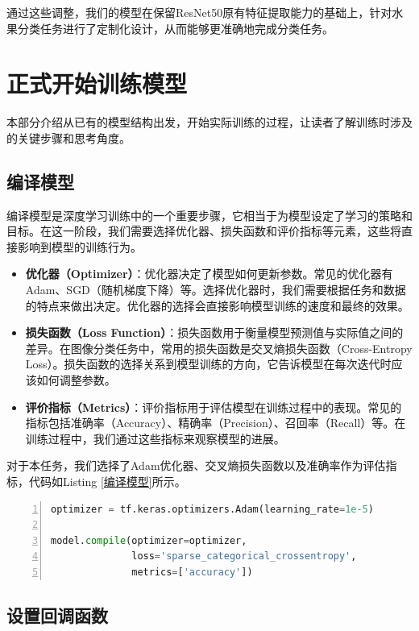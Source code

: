 通过这些调整，我们的模型在保留ResNet50原有特征提取能力的基础上，针对水果分类任务进行了定制化设计，从而能够更准确地完成分类任务。

\section{正式开始训练模型}

本部分介绍从已有的模型结构出发，开始实际训练的过程，让读者了解训练时涉及的关键步骤和思考角度。

\subsection{编译模型}

编译模型是深度学习训练中的一个重要步骤，它相当于为模型设定了学习的策略和目标。在这一阶段，我们需要选择优化器、损失函数和评价指标等元素，这些将直接影响到模型的训练行为。

\begin{itemize}
    \item \textbf{优化器（Optimizer）}：优化器决定了模型如何更新参数。常见的优化器有Adam、SGD（随机梯度下降）等。选择优化器时，我们需要根据任务和数据的特点来做出决定。优化器的选择会直接影响模型训练的速度和最终的效果。
    \item \textbf{损失函数（Loss Function）}：损失函数用于衡量模型预测值与实际值之间的差异。在图像分类任务中，常用的损失函数是交叉熵损失函数（Cross-Entropy Loss）。损失函数的选择关系到模型训练的方向，它告诉模型在每次迭代时应该如何调整参数。
    \item \textbf{评价指标（Metrics）}：评价指标用于评估模型在训练过程中的表现。常见的指标包括准确率（Accuracy）、精确率（Precision）、召回率（Recall）等。在训练过程中，我们通过这些指标来观察模型的进展。
\end{itemize}
对于本任务，我们选择了Adam优化器、交叉熵损失函数以及准确率作为评估指标，代码如Listing \ref{编译模型}所示。
\begin{lstlisting}[language={python},label={编译模型},caption={编译模型}, basicstyle=\footnotesize\ttfamily, breaklines=true, numbers=left, frame=single]
optimizer = tf.keras.optimizers.Adam(learning_rate=1e-5)

model.compile(optimizer=optimizer,
              loss='sparse_categorical_crossentropy',
              metrics=['accuracy'])
\end{lstlisting}
\subsection{设置回调函数}

